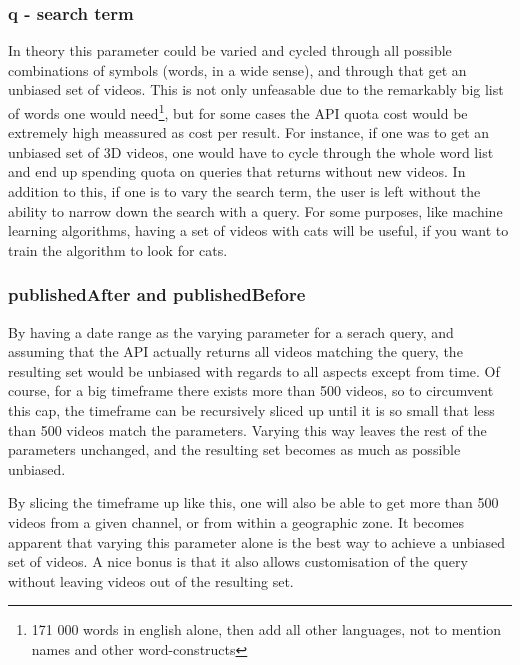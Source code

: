 \subsubsection{q - search term}
In theory this parameter could be varied and cycled through all possible
combinations of symbols (words, in a wide sense), and through that get an
unbiased set of videos. This is not only unfeasable due to the remarkably big
list of words one would need\footnote{171 000 words in english alone, then add
all other languages, not to mention names and other word-constructs}, but for
some cases the API quota cost would be extremely high meassured as cost per
result. For instance, if one was to get an unbiased set of 3D videos, one would
have to cycle through the whole word list and end up spending quota on queries
that returns without new videos. In addition to this, if one is to vary the
search term, the user is left without the ability to narrow down the search
with a query. For some purposes, like machine learning algorithms, having a set
of videos with cats will be useful, if you want to train the algorithm to look
for cats.

\subsubsection{publishedAfter and publishedBefore}
By having a date range as the varying parameter for a serach query, and assuming
that the API actually returns all videos matching the query, the resulting set
would be unbiased with regards to all aspects except from time. Of course, for
a big timeframe there exists more than 500 videos, so to circumvent this cap,
the timeframe can be recursively sliced up until it is so small that less than
500 videos match the parameters. Varying this way leaves the rest of the
parameters unchanged, and the resulting set becomes as much as possible
unbiased.

By slicing the timeframe up like this, one will also be able to get more than
500 videos from a given channel, or from within a geographic zone. It becomes
apparent that varying this parameter alone is the best way to achieve a unbiased
set of videos. A nice bonus is that it also allows customisation of the query
without leaving videos out of the resulting set.

